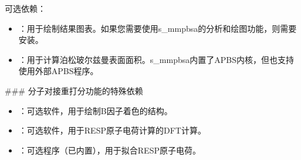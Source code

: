 \documentclass[letterpaper,10pt,english]{sphinxmanual}
\begin{document}
\sphinxAtStartPar
可选依赖：
\begin{itemize}
\item {} 
\sphinxAtStartPar
{}：用于绘制结果图表。如果您需要使用s\_mmpbsa的分析和绘图功能，则需要安装。

\item {} 
\sphinxAtStartPar
{}：用于计算泊松\sphinxhyphen{}玻尔兹曼表面面积。s\_mmpbsa内置了APBS内核，但也支持使用外部APBS程序。

\end{itemize}

\sphinxAtStartPar
\#\#\# 分子对接重打分功能的特殊依赖
\begin{itemize}
\item {} 
\sphinxAtStartPar
{}：可选软件，用于绘制B因子着色的结构。

\item {} 
\sphinxAtStartPar
{}：可选软件，用于RESP原子电荷计算的DFT计算。

\item {} 
\sphinxAtStartPar
{}：可选程序（已内置），用于拟合RESP原子电荷。

\end{itemize}
\end{document}
